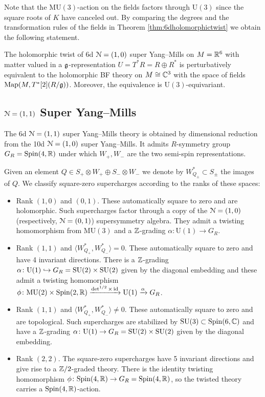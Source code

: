 \documentclass[10pt, oneside]{article}
\newcommand{\MU}{\mathrm{MU}}
\renewcommand{\U}{\mathrm{U}}
\begin{document}
Note that the $\MU(3)$-action on the fields factors through $\U(3)$ since the square roots of $K$ have canceled out. By comparing the degrees and the transformation rules of the fields in Theorem \ref{thm:6dholomorphictwist} we obtain the following statement.

\begin{theorem}
The holomorphic twist of 6d $\mathcal N=(1, 0)$ super Yang--Mills on $M=\mathbb R^6$ with matter valued in a $\mathfrak g$-representation $U=T^*R=R\oplus R^*$ is perturbatively equivalent to the holomorphic BF theory on $M\cong \mathbb C^3$ with the space of fields $\operatorname{Map}(M, T^*[2] (R/\mathfrak g))$. Moreover, the equivalence is $\U(3)$-equivariant.
\label{thm:6dholomorphictwistgraded}
\end{theorem}

\subsection{\texorpdfstring{$\mathcal N=(1, 1)$}{N=(1, 1)} Super Yang--Mills}

The 6d $\mathcal N=(1, 1)$ super Yang--Mills theory is obtained by dimensional reduction from the 10d $\mathcal N=(1, 0)$ super Yang--Mills. It admits $R$-symmetry group $G_R=\mathrm{Spin}(4, \mathbb R)$ under which $W_+, W_-$ are the two semi-spin representations.

Given an element $Q\in S_+\otimes W_+\oplus S_-\otimes W_-$ we denote by $W^*_{Q_\pm}\subset S_\pm$ the images of $Q$. We classify square-zero supercharges according to the ranks of these spaces:
\begin{itemize}
\item Rank $(1, 0)$ and $(0, 1)$. These automatically square to zero and are holomorphic.  Such supercharges factor through a copy of the $\mathcal{N}=(1,0)$ (respectively, $\mathcal N=(0, 1)$) supersymmetry algebra. They admit a twisting homomorphism from $\MU(3)$ and a $\mathbb Z$-grading $\alpha\colon \U(1)\rightarrow G_R$.

\item Rank $(1, 1)$ and $\langle W^*_{Q_+}, W^*_{Q_-}\rangle = 0$. These automatically square to zero and have 4 invariant directions. There is a $\mathbb Z$-grading $\alpha\colon \U(1)\hookrightarrow G_R=\SU(2)\times \SU(2)$ given by the diagonal embedding and these admit a twisting homomorphism $\phi\colon \MU(2)\times \Spin(2, \RR)\xrightarrow{\det^{1/2}\times \id}\U(1)\xrightarrow{\alpha} G_R$.

\item Rank $(1, 1)$ and $\langle W^*_{Q_+}, W^*_{Q_-}\rangle \neq 0$. These automatically square to zero and are topological. Such supercharges are stabilized by $\mathrm{SU}(3)\subset \mathrm{Spin}(6, \mathbb C)$ and have a $\mathbb Z$-grading $\alpha\colon \U(1)\rightarrow G_R=\SU(2)\times \SU(2)$ given by the diagonal embedding.

\item Rank $(2, 2)$. The square-zero supercharges have 5 invariant directions and give rise to a $\mathbb Z/2$-graded theory. There is the identity twisting homomorphism $\phi\colon \mathrm{Spin}(4, \mathbb R)\rightarrow G_R=\mathrm{Spin}(4, \mathbb R)$, so the twisted theory carries a $\mathrm{Spin}(4, \mathbb R)$-action.
\end{itemize}
\end{document}
